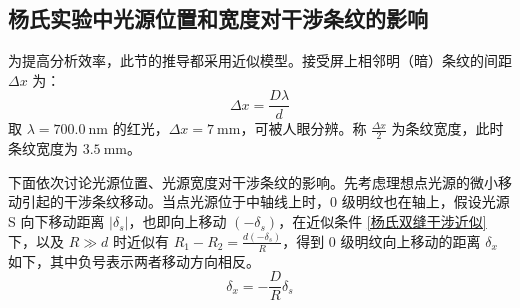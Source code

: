 \documentclass[UTF8]{report}
\theoremstyle{MyLineTheoremStyle} %
\theoremstyle{MyBlockTheoremStyle} %
\theoremstyle{MySubsubsectionStyle} %
\begin{document}
\subsection{杨氏实验中光源位置和宽度对干涉条纹的影响}\label{杨氏实验中光源位置和宽度对干涉条纹的影响}

为提高分析效率，此节的推导都采用近似模型。接受屏上相邻明（暗）条纹的间距 $\Delta x$ 为：
\begin{equation}
\Delta x = \frac{D \lambda}{d}
\end{equation}
取 $\lambda = 700.0\ \mathrm{nm}$ 的红光，$\Delta x = 7 \ \mathrm{mm}$，可被人眼分辨。称 $\frac{\Delta x}{2}$ 为条纹宽度，此时条纹宽度为 $3.5\ \mathrm{mm}$。

下面依次讨论光源位置、光源宽度对干涉条纹的影响。先考虑理想点光源的微小移动引起的干涉条纹移动。当点光源位于中轴线上时，0 级明纹也在轴上，假设光源 S 向下移动距离 $| \delta_s |$，也即向上移动 $(-\delta_s)$，在近似条件 \ref{杨氏双缝干涉近似} 下，以及 $R \gg d$ 时近似有 $R_1 - R_2 = \frac{d(-\delta_s)}{R}$，得到 0 级明纹向上移动的距离 $\delta_x$ 如下，其中负号表示两者移动方向相反。
\begin{equation}
\delta_x = - \frac{D}{R}\delta_s
\end{equation}
\end{document}
